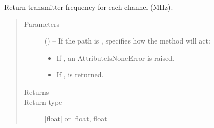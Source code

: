 \documentclass[letterpaper,10pt,english]{sphinxmanual}
\begin{document}
\begin{fulllineitems}
\begin{fulllineitems}
\begin{quote}
\begin{description}
\begin{itemize}
\end{itemize}

\end{description}\end{quote}

\end{fulllineitems}


\begin{fulllineitems}
\label{\detokenize{references/core:nmrespy.core.Estimator.get_sfo}}
\sphinxAtStartPar
Return transmitter frequency for each channel (MHz).
\begin{quote}\begin{description}
\item[{Parameters}] \leavevmode
\sphinxAtStartPar
{} (\sphinxstyleliteralemphasis{\sphinxupquote{, }}) – 
\sphinxAtStartPar
If the path is ,  specifies how the method will act:
\begin{itemize}
\item {} 
\sphinxAtStartPar
If , an AttributeIsNoneError is raised.

\item {} 
\sphinxAtStartPar
If ,  is returned.

\end{itemize}


\item[{Returns}] \leavevmode
\sphinxAtStartPar
{}

\item[{Return type}] \leavevmode
\sphinxAtStartPar
{[}float{]} or {[}float, float{]}

\end{description}\end{quote}

\end{fulllineitems}



\end{fulllineitems}
\end{document}
